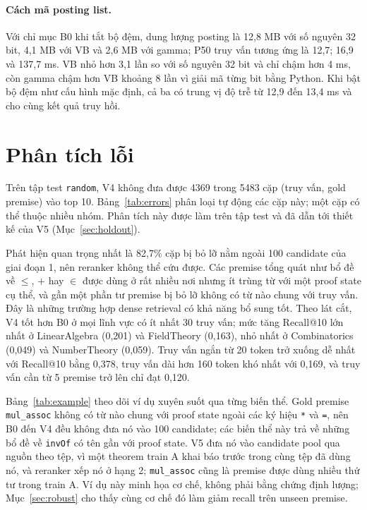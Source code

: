 \documentclass[11pt,a4paper,oneside]{report}
\newcommand{\code}[1]{\texttt{#1}}
\begin{document}
\paragraph{Cách mã posting list.} Với chỉ mục B0 khi tắt bộ đệm, dung lượng posting là 12,8 MB với số nguyên 32 bit,
4,1 MB với VB và 2,6 MB với gamma; P50 truy vấn tương ứng là 12,7; 16,9 và 137,7 ms. VB nhỏ hơn 3,1 lần so với số nguyên 32
bit và chỉ chậm hơn 4 ms, còn gamma chậm hơn VB khoảng 8 lần vì giải mã từng bit bằng Python. Khi bật bộ đệm như cấu hình
mặc định, cả ba có trung vị độ trễ từ 12,9 đến 13,4 ms và cho cùng kết quả truy hồi.

\section{Phân tích lỗi}\label{sec:errors}

Trên tập test \code{random}, V4 không đưa được \num{4369} trong \num{5483} cặp (truy vấn, gold premise) vào top 10.
Bảng~\ref{tab:errors} phân loại tự động các cặp này; một cặp có thể thuộc nhiều nhóm. Phân tích này được làm trên tập test và đã dẫn tới thiết kế của V5 (Mục~\ref{sec:holdout}).



Phát hiện quan trọng nhất là 82,7\% cặp bị bỏ lỡ nằm ngoài 100 candidate của giai đoạn 1, nên reranker không thể cứu
được. Các premise tổng quát như bổ đề về $\le$, $+$ hay $\in$ được dùng ở rất nhiều nơi nhưng ít trùng từ với một proof
state cụ thể, và gần một phần tư premise bị bỏ lỡ không có từ nào chung với truy vấn. Đây là những trường hợp dense
retrieval có khả năng bổ sung tốt. Theo lát cắt, V4 tốt hơn B0 ở mọi lĩnh vực có ít nhất 30 truy vấn; mức tăng Recall@10 lớn nhất
ở LinearAlgebra (0,201) và FieldTheory (0,163), nhỏ nhất ở Combinatorics (0,049) và NumberTheory (0,059). Truy vấn ngắn từ
20 token trở xuống dễ nhất với Recall@10 bằng 0,378, truy vấn dài hơn 160 token khó nhất với 0,169, và truy vấn cần từ 5
premise trở lên chỉ đạt 0,120.

Bảng~\ref{tab:example} theo dõi ví dụ xuyên suốt qua từng biến thể. Gold premise \code{mul\_assoc} không có từ nào chung
với proof state ngoài các ký hiệu \code{*} và \code{=}, nên B0 đến V4 đều không đưa nó vào 100 candidate; các biến thể này
trả về những bổ đề về \code{invOf} có tên gần với proof state. V5 đưa nó vào candidate pool qua nguồn theo tệp, vì một
theorem train A khai báo trước trong cùng tệp đã dùng nó, và reranker xếp nó ở hạng 2; \code{mul\_assoc} cũng là premise
được dùng nhiều thứ tư trong train A. Ví dụ này minh họa cơ chế, không phải bằng chứng định lượng; Mục~\ref{sec:robust}
cho thấy cùng cơ chế đó làm giảm recall trên unseen premise.
\end{document}
